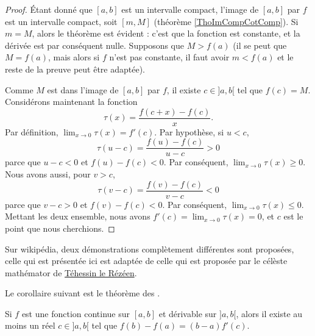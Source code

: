 \begin{proof}
    Étant donné que $[a,b]$ est un intervalle compact, l'image de $[a,b]$ par $f$ est un intervalle compact, soit $[m,M]$ (théorème \ref{ThoImCompCotComp}). Si $m=M$, alors le théorème est évident : c'est que la fonction est constante, et la dérivée est par conséquent nulle. Supposons que $M> f(a)$ (il se peut que $M=f(a)$, mais alors si $f$ n'est pas constante, il faut avoir $m<f(a)$ et le reste de la preuve peut être adaptée).

    Comme $M$ est dans l'image de $[a,b]$ par $f$, il existe $c\in ]a,b[$ tel que $f(c)=M$. Considérons maintenant la fonction
    \begin{equation}
        \tau(x) =\frac{ f(c+x)-f(c) }{ x }.
    \end{equation}
    Par définition, $\lim_{x\to 0}\tau(x)=f'(c)$. Par hypothèse, si $u<c$,
    \begin{equation}
        \tau(u-c) = \frac{ f(u)-f(c) }{ u-c }>0
    \end{equation}
    parce que $u-c<0$ et $f(u)-f(c)<0$. Par conséquent, $\lim_{x\to 0}\tau(x)\geq 0$. Nous avons aussi, pour $v>c$,
    \begin{equation}
        \tau(v-c) = \frac{ f(v)-f(c) }{ v-c }<0
    \end{equation}
    parce que $v-c>0$ et $f(v)-f(c)<0$. Par conséquent, $\lim_{x\to 0}\tau(x)\leq 0$. Mettant les deux ensemble, nous avons $f'(c)=\lim_{x\to 0}\tau(x)=0$, et $c$ est le point que nous cherchions.
\end{proof}

Sur wikipédia, deux démonstrations complètement différentes sont proposées, celle qui est présentée ici est adaptée de celle qui est proposée par le célèste mathémator de \href{http://gconnan.free.fr/les\%20pdf/Deriv.pdf}{Téhessin le Rézéen}.

Le corollaire suivant est le théorème des .

\begin{theorem}       \label{ThoAccFinis}
    Si $f$ est une fonction continue sur $[a,b]$ et dérivable sur $]a,b[$, alors il existe au moins un réel $c\in]a,b[$ tel que $f(b)-f(a)=(b-a)f'(c)$.
\end{theorem}

